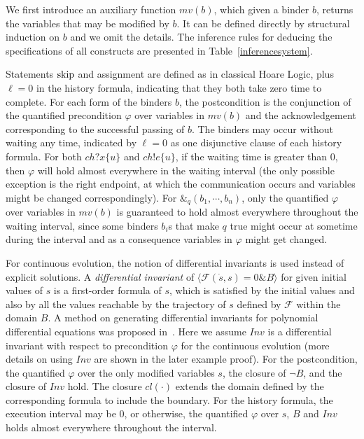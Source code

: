 \documentclass{llncs}
\newcommand{\pskip}{\textmd{skip}}
\newcommand{\evolution}[3]{\langle \mathcal{#1}(\dot{#2},#2)=0 \& #3\rangle}
\newcommand{\close}[1]{cl(#1)}
\newcommand{\Pre}{\varphi}
\begin{document}
We first introduce an auxiliary  function
$mv(b)$, which given a binder $b$, returns the variables that may be modified by $b$. It can be defined directly  by structural induction on $b$ and we omit the details.
The inference rules for deducing the
 specifications of all constructs are presented in Table~\ref{inferencesystem}.



Statements $\pskip$ and assignment are defined as in classical Hoare Logic, plus
$\ell=0$ in the history formula, indicating that they both take zero time to complete.
For each form of the binders $b$, the postcondition is the conjunction of
the quantified precondition $\Pre$ over variables in
$mv(b)$ and  the acknowledgement corresponding to the successful
passing of $b$. The binders  may occur without waiting any time,
indicated by $\ell =0$ as one disjunctive clause of each history formula.
For both $ch?x\{u\}$ and $ch!e\{u\}$, if the waiting time is greater than
0, then  $\Pre$ will hold almost everywhere in the waiting interval
 (the only possible exception is the right endpoint, at which the communication occurs and variables might be changed correspondingly). For
 $\&_q(b_1, \cdots, b_n)$,  only the quantified $\Pre$  over  variables in
$mv(b)$ is guaranteed to hold almost everywhere throughout the waiting interval, since
some binders $b_i$s that make $q$ true might occur at sometime during the interval
and as a consequence variables in $\Pre$ might get changed.




For continuous evolution, the notion of differential invariants is used instead of explicit solutions.
A \emph{differential invariant} of $\evolution{F}{s}{B}$
for given initial values of $s$ is a first-order formula of $s$, which is satisfied by the initial values and also by all the values
reachable by the trajectory of $s$ defined by $\mathcal{F}$ within the domain $B$.
A method on generating differential invariants for polynomial differential equations was
proposed in~\cite{LZZ11}.
Here we assume $Inv$ is a differential invariant with respect to precondition $\Pre$ for the continuous evolution (more details on using
$Inv$ are shown in the later example proof). For the postcondition,
the quantified $\Pre$ over  the only
modified variables $s$, the closure of $\neg B$, and the closure of
$Inv$ hold. The closure $\close{\cdot}$  extends the domain defined by the corresponding formula to include the boundary.
For the history formula,  the execution interval may be 0, or otherwise, the quantified $\Pre$ over $s$, $B$ and $Inv$ holds almost everywhere throughout the
 interval.
\end{document}
